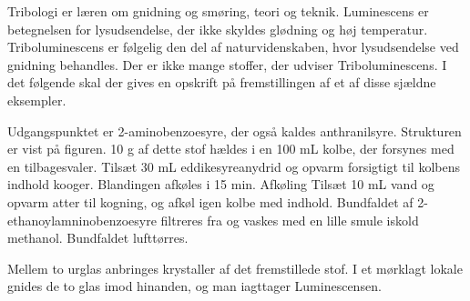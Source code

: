 


Tribologi er læren om gnidning og smøring, teori og teknik. Luminescens er betegnelsen for lysudsendelse, der ikke skyldes glødning og høj temperatur. Triboluminescens er følgelig den del af naturvidenskaben, hvor lysudsendelse ved gnidning behandles.
Der er ikke mange stoffer, der udviser Triboluminescens. I det følgende skal der gives en opskrift på fremstillingen af et af disse sjældne eksempler.

Udgangspunktet er 2-aminobenzoesyre, der også kaldes anthranilsyre. Strukturen er vist på figuren. 10 g af dette stof hældes i en 100 mL kolbe, der forsynes med en tilbagesvaler.
Tilsæt 30 mL eddikesyreanydrid og opvarm forsigtigt til kolbens indhold kooger.
Blandingen afkøles i 15 min.
Afkøling
Tilsæt 10 mL vand og opvarm atter til kogning, og afkøl igen kolbe med indhold.
Bundfaldet af 2-ethanoylamninobenzoesyre filtreres fra og vaskes med en lille smule iskold methanol.
Bundfaldet lufttørres.


Mellem to urglas anbringes krystaller af det fremstillede stof. I et mørklagt lokale gnides de to glas imod hinanden, og man iagttager Luminescensen.


